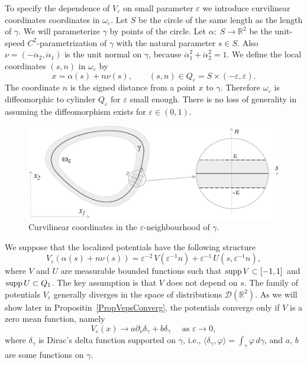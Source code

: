 \documentclass[graybox]{svmult}
\newcommand{\supp}{\mathop{\rm supp}}
\newcommand{\Real}{\mathbb R}
\newcommand{\eps}{\varepsilon}
\renewcommand{\phi}{\varphi}
\begin{document}
To specify  the dependence of $V_\eps$ on  small parameter $\eps$ we introduce  curvilinear coordinates coordinates in $\omega_\eps$.
Let $S$ be the circle of the same length as the length of $\gamma$.
We will parameterize $\gamma$ by points of the circle.
Let $\alpha\colon\; S\to \Real^2$ be the unit-speed $C^2$-parametrization of $\gamma$ with the natural parameter $s\in S$.
Also  $\nu=(-\dot{\alpha}_2, \dot{\alpha}_1)$ is the unit normal on $\gamma$, because  $\dot{\alpha}_1^2+\dot{\alpha}_2^2=1$.
We define the local coordinates $(s,n)$ in $\omega_\eps$ by
\begin{equation}\label{LocalTr}
    x=\alpha(s)+n\nu(s), \qquad (s,n)\in Q_\eps=S\times (-\eps, \eps).
\end{equation}
The coordinate $n$ is the signed distance from a point $x$ to $\gamma$.
Therefore  $\omega_\eps$ is diffeomorphic to cylinder $Q_\eps$ for $\eps$ small enough. There is no loss of generality in assuming the diffeomorphism exists for $\eps\in (0,1)$.

\begin{figure}[b]
\centering
\includegraphics[scale=.6]{LocalCoords}
\caption{Curvilinear coordinates in the $\eps$-neighbourhood of $\gamma$.}
\label{FigLocalCoords}
\end{figure}


We suppose that the localized potentials have the following structure
\begin{equation}\label{Veps}
V_\eps(\alpha(s)+n\nu(s))=\eps^{-2}\,V\left(\eps^{-1}n\right)
+\eps^{-1}\,U\left(s,\eps^{-1}n\right),
\end{equation}
where $V$ and $U$ are measurable bounded functions such that $\supp V\subset [-1,1]$ and $\supp U\subset Q_1$. The key assumption is that $V$ does not depend on  $s$.
The family of potentials $V_\eps$ generally diverges in the space of distributions $\mathcal{D}(\Real^2)$.
As we will show later in Propositin~\ref{PropVepsConverg},
the  potentials converge only if $V$ is a zero mean function, namely
$$
   V_\eps(x)\to a \partial_\nu\delta_\gamma+b\delta_\gamma\quad \mbox{ as \ }\eps\to 0,
$$
where $\delta_\gamma$ is Dirac's delta function supported on $\gamma$, i.e., $\langle\delta_\gamma, \phi\rangle=\int_\gamma \phi \,d \gamma$,  and $a$, $b$ are some functions on $\gamma$.
\end{document}
